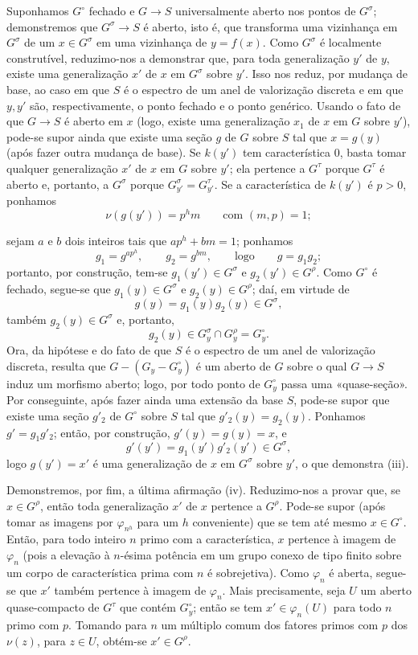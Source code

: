 \documentclass[11pt,twoside,openany]{book}
\numberwithin{equation}{section}
\newcommand{\src}[1]{%
  \phantomsection\hypertarget{src:#1}{}%
  \marginpar{\raggedleft\footnotesize\sffamily #1}%
}
\theoremstyle{plain}
\theoremstyle{definition}
\theoremstyle{remark}
\newcommand{\FgaUnitKey}{frontmatter}
\renewcommand{\src}[1]{%
  \phantomsection\hypertarget{src:\FgaUnitKey:#1}{}%
  \marginpar{\raggedleft\footnotesize\sffamily #1}%
}
\begin{document}
Suponhamos $G^\circ$ fechado e $G\longrightarrow S$ universalmente aberto nos
pontos de $G^\sigma$; demonstremos que $G^\sigma\longrightarrow S$ é aberto,
isto é, que transforma uma vizinhança em $G^\sigma$ de um $x\in G^\sigma$
em uma vizinhança de $y=f(x)$. Como $G^\sigma$ é localmente construtível,
reduzimo-nos a demonstrar que, para toda generalização $y'$ de $y$, existe uma
generalização $x'$ de $x$ em $G^\sigma$ sobre $y'$. Isso nos reduz, por
mudança de base, ao caso em que $S$ é o espectro de um anel de valorização
discreta e em que $y,y'$ são, respectivamente, o ponto fechado e o ponto
genérico. Usando o fato de que $G\longrightarrow S$ é aberto em $x$ (logo,
existe uma generalização $x_1$ de $x$ em $G$ sobre $y'$), pode-se supor ainda
que existe uma seção $g$ de $G$ sobre $S$ tal que $x=g(y)$ (após fazer outra
mudança de base). Se $k(y')$ tem característica 0, basta tomar qualquer
generalização $x'$ de $x$ em $G$ sobre $y'$; ela pertence a $G^\tau$ porque
$G^\tau$ é aberto e, portanto, a $G^\sigma$ porque
$G_{y'}^\sigma=G_{y'}^\tau$. Se a característica de $k(y')$ é $p>0$,
ponhamos
\[
\nu(g(y'))=p^hm\qquad\text{com }(m,p)=1 ;
\]
\src{227}
sejam $a$ e $b$ dois inteiros tais que $ap^h+bm=1$; ponhamos
\[
g_1=g^{ap^h},\qquad g_2=g^{bm},\qquad\text{logo}\qquad g=g_1g_2 ;
\]
portanto, por construção, tem-se $g_1(y')\in G^\sigma$ e
$g_2(y')\in G^\rho$. Como $G^\circ$ é fechado, segue-se que
$g_1(y)\in G^\sigma$ e $g_2(y)\in G^\rho$; daí, em virtude de
\[
g(y)=g_1(y)g_2(y)\in G^\sigma,
\]
também $g_2(y)\in G^\sigma$ e, portanto,
\[
g_2(y)\in G_y^\sigma\cap G_y^\rho=G_y^\circ.
\]
Ora, da hipótese e do fato de que $S$ é o espectro de um anel de valorização
discreta, resulta que $G-(G_y-G_y^\circ)$ é um aberto de $G$ sobre o qual
$G\longrightarrow S$ induz um morfismo aberto; logo, por todo ponto de
$G_y^\circ$ passa uma «quase-seção». Por conseguinte, após fazer ainda uma
extensão da base $S$, pode-se supor que existe uma seção $g'_2$ de $G^\circ$
sobre $S$ tal que $g'_2(y)=g_2(y)$. Ponhamos $g'=g_1g'_2$; então, por
construção, $g'(y)=g(y)=x$, e
\[
g'(y')=g_1(y')g'_2(y')\in G^\sigma,
\]
logo $g(y')=x'$ é uma generalização de $x$ em $G^\sigma$ sobre $y'$, o que demonstra
(iii).

Demonstremos, por fim, a última afirmação (iv). Reduzimo-nos a provar que, se
$x\in G^\rho$, então toda generalização $x'$ de $x$ pertence a $G^\rho$.
Pode-se supor (após tomar as imagens por $\varphi_{n^h}$ para um $h$
conveniente) que se tem até mesmo
$x\in G^\circ$. Então, para todo inteiro $n$ primo com a característica, $x$
pertence à imagem de $\varphi_n$ (pois a elevação à $n$-ésima potência em um
grupo conexo de tipo finito sobre um corpo de característica prima com $n$ é
sobrejetiva). Como $\varphi_n$ é aberta, segue-se que $x'$ também pertence à
imagem de $\varphi_n$. Mais precisamente, seja $U$ um aberto quase-compacto de
$G^\tau$ que contém $G_y^\circ$; então se tem $x'\in\varphi_n(U)$ para todo
$n$ primo com $p$. Tomando para $n$ um múltiplo comum dos fatores primos com
$p$ dos $\nu(z)$, para $z\in U$, obtém-se $x'\in G^\rho$.
\end{document}
